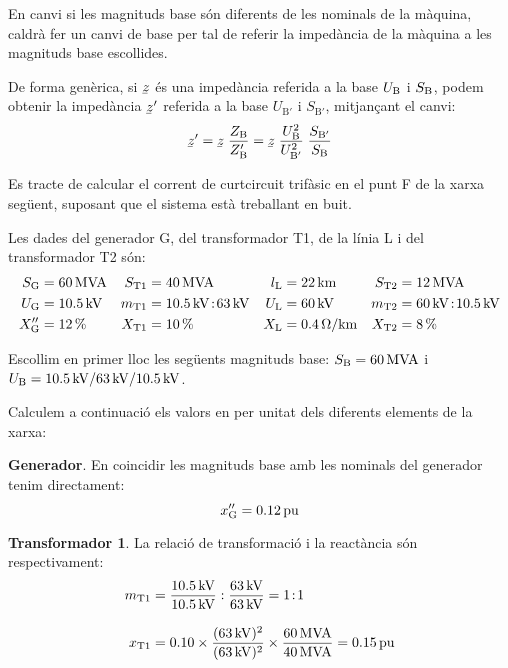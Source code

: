  En canvi si les magnituds base són diferents de les nominals de la màquina, caldrà fer un canvi de base per tal de referir la impedància de la màquina a les magnituds base escollides.

De forma genèrica, si $\cmplx{z}$ és una impedància referida a la base $U_\mathrm{B}$ i $S_\mathrm{B}$, podem obtenir la impedància $\cmplx{z}'$ referida a la base $U_{\text{B}'}$ i $S_{\text{B}'}$, mitjançant el canvi:
\begin{equation}
   \cmplx{z}' = \cmplx{z} \; \frac{Z\ped{B}}{Z\ped{B}'} = \cmplx{z} \; \frac{U\ped{B}^2}{U_{\text{B}'}^2} \; \frac{S_{\text{B}'}}{S\ped{B}}\label{eq_pu_canvi_base}
\end{equation}

\begin{exemple}\label{ex:cc-pu}
    Es tracte de calcular el corrent de curtcircuit trifàsic en el punt F de la xarxa següent, suposant
    que el sistema està treballant en buit.
    \begin{center}
        
    \end{center}

    Les dades del generador G, del transformador T1, de la línia L i del transformador T2 són:
    \begin{align*}
       S_\mathrm{G} &= \SI{60}{MVA} & S_\mathrm{T1} &= \SI{40}{MVA} & l_\mathrm{L} &= \SI{22}{km} & S_\mathrm{T2} &=
       \SI{12}{MVA} \\
       U_\mathrm{G} &= \SI{10,5}{kV} & m_\mathrm{T1} &= \SI{10,5}{kV}\!:\!\SI{63}{kV} & U_\mathrm{L} &= \SI{60}{kV} & m_\mathrm{T2} &= \SI{60}{kV}\!:\!\SI{10,5}{kV} \\
       X''_\mathrm{G} &= \SI{12}{\%} & X_\mathrm{T1} &= \SI{10}{\%} & X_\mathrm{L} &= \SI{0,4}{\ensuremath{\mathrm{\Omega}}/km} & X_\mathrm{T2} &= \SI{8}{\%}
    \end{align*}

    Escollim en primer lloc les següents magnituds base: $S_\mathrm{B} = \SI{60}{MVA}$ i $U_\mathrm{B}
    = \SI{10,5}{kV} / \SI{63}{kV} / \SI{10,5}{kV}$.

    Calculem a continuació els valors en per unitat dels diferents elements de la xarxa:

    \textbf{Generador}. En coincidir les magnituds base amb les nominals del generador tenim
     directament:
    \[
    x''_\mathrm{G} = \SI{0,12}{pu}
    \]

    \textbf{Transformador 1}. La relació de transformació i la reactància són respectivament:
    \begin{align*}
    m_\mathrm{T1} &= \frac{\SI{10,5}{kV}}{\SI{10,5}{kV}} :
    \frac{\SI{63}{kV}}{\SI{63}{kV}} = 1\!:\!1 \\[3mm]
    x_\mathrm{T1} &= \num{0,10} \times \frac{(\SI{63}{kV})^2}{(\SI{63}{kV})^2} \times
    \frac{\SI{60}{MVA}}{\SI{40}{MVA}}  = \SI{0,15}{pu}
    \end{align*}


\end{exemple}
